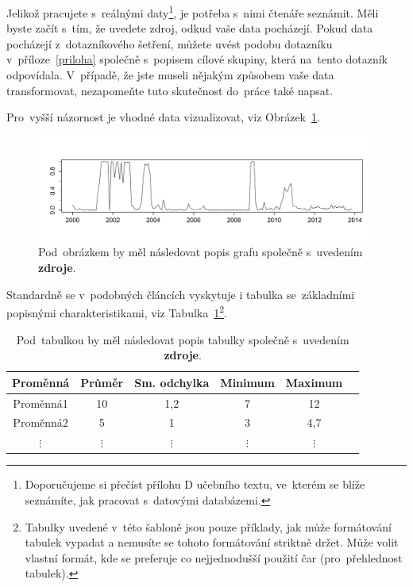 \documentclass[12pt,a4paper,oneside,final]{article}
\theoremstyle{definition}
\theoremstyle{remark}
\numberwithin{equation}{section}
\begin{document}
Jelikož pracujete s~reálnými daty\footnote{Doporučujeme si přečíst přílohu D učebního textu, ve~kterém se blíže seznámíte, jak pracovat s~datovými databázemi.}, je potřeba s~nimi čtenáře seznámit. Měli byste začít s~tím, že uvedete zdroj, odkud vaše data pocházejí. Pokud data pocházejí z~dotazníkového šetření, můžete uvést podobu dotazníku v~příloze~\ref{priloha} společně s~popisem cílové skupiny, která na~tento dotazník odpovídala. V~případě, že jste museli nějakým způsobem vaše data transformovat, nezapomeňte tuto skutečnost do~práce také napsat.

Pro~vyšší názornost je vhodné data vizualizovat, viz Obrázek~\ref{obr:example}.

\begin{figure}[htb]
\centering
\includegraphics[width=.9\textwidth]{images/example.pdf}
\caption{Pod~obrázkem by měl následovat popis grafu společně s~uvedením \textbf{zdroje}.}
\label{obr:example} %
\end{figure}

Standardně se v~podobných článcích vyskytuje i tabulka se~základními popisnými charakteristikami, viz Tabulka~\ref{tab:charakteristiky}\footnote{Tabulky uvedené v~této šabloně jsou pouze příklady, jak může formátování tabulek vypadat a nemusíte se tohoto formátování striktně držet. Může volit vlastní formát, kde se preferuje co nejjednodušší použití čar (pro~přehlednost tabulek).}.

\begin{table}[htb]
\caption{Pod~tabulkou by měl následovat popis tabulky společně s~uvedením \textbf{zdroje}.}
\centering
\begin{tabular}{cccccc}
\textbf{Proměnná} & \textbf{Průměr} & \textbf{Sm. odchylka} & \textbf{Minimum} & \textbf{Maximum} \\
\hline
Proměnná1 & 10 & 1,2 & 7 & 12  \\
Proměnná2 & 5 & 1 & 3 & 4,7  \\
$\vdots$ & $\vdots$ & $\vdots$ & $\vdots$ & $\vdots$ \\
\hline
\end{tabular}
\label{tab:charakteristiky}
\end{table}
\end{document}
